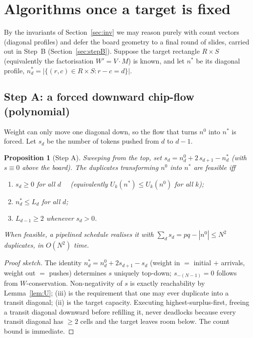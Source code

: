 \documentclass[11pt]{article}
\theoremstyle{definition}
\theoremstyle{plain}
\newtheorem{proposition}{Proposition}
\theoremstyle{remark}
\begin{document}
\section{Algorithms once a target is fixed}\label{sec:algo}

By the invariants of Section~\ref{sec:inv} we may reason purely with count vectors
(diagonal profiles) and defer the board geometry to a final round of slides, carried out in
Step~B (Section~\ref{sec:stepB}).  Suppose the target rectangle $R\times S$ (equivalently the
factorisation $W'=V\cdot M$) is known, and let $n^{*}$ be its diagonal profile,
$n^{*}_d=|\{(r,c)\in R\times S: r-c=d\}|$.

\subsection{Step A: a forced downward chip-flow (polynomial)}

Weight can only move one diagonal down, so the flow that turns $n^0$ into $n^{*}$
is forced.  Let $s_d$ be the number of tokens pushed from $d$ to $d-1$.

\begin{proposition}[Step A]\label{prop:A}
Sweeping from the top, set $s_d=n^0_d+2\,s_{d+1}-n^{*}_d$ (with $s\equiv 0$ above
the board).  The duplicates transforming $n^0$ into $n^{*}$ are feasible iff
\begin{enumerate}[label=\textup{(\roman*)},leftmargin=2.4em]
\item $s_d\ge 0$ for all $d$ \ \ (equivalently $U_k(n^{*})\le U_k(n^0)$ for all $k$);
\item $n^{*}_d\le L_d$ for all $d$;
\item $L_{d-1}\ge 2$ whenever $s_d>0$.
\end{enumerate}
When feasible, a pipelined schedule realises it with
$\sum_d s_d=pq-|n^0|\le N^2$ duplicates, in $O(N^2)$ time.
\end{proposition}
\begin{proof}[Proof sketch]
The identity $n^{*}_d=n^0_d+2s_{d+1}-s_d$ (weight in $=$ initial $+$ arrivals,
weight out $=$ pushes) determines $s$ uniquely top-down; $s_{-(N-1)}=0$ follows
from $W$-conservation.  Non-negativity of $s$ is exactly reachability by
Lemma~\ref{lem:U}; (iii) is the requirement that one may ever duplicate into a
transit diagonal; (ii) is the target capacity.  Executing highest-surplus-first,
freeing a transit diagonal downward before refilling it, never deadlocks because
every transit diagonal has $\ge 2$ cells and the target leaves room below.  The
count bound is immediate.
\end{proof}
\end{document}
